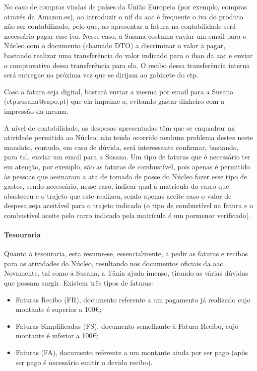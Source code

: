 No caso de compras vindas de países da União Europeia (por exemplo, compras através da Amazon.es), ao introduzir o \acrshort{nif} da \acrshort{aac} é frequente o \acrshort{iva} do produto não ser contabilizado, pelo que, ao apresentar a fatura na contabilidade será necessário pagar esse \acrshort{iva}. Nesse caso, a Susana costuma enviar um email para o Núcleo com o documento (chamado DTO) a discriminar o valor a pagar, bastando realizar uma transferência do valor indicado para o \acrshort{iban} da \acrshort{aac} e enviar o comprovativo dessa transferência para ela. O recibo dessa transferência interna será entregue na próxima vez que se dirijam ao gabinete do \acrshort{ctp}.

Caso a fatura seja digital, bastará enviar a mesma por email para a Susana (ctp.susana@sapo.pt) que ela imprime-a, evitando gastar dinheiro com a impressão da mesma.

A nível de contabilidade, as despesas apresentadas têm que se enquadrar na atividade permitida ao Núcleo, não tendo ocorrido nenhum problema destes neste mandato, contudo, em caso de dúvida, será interessante confirmar, bastando, para tal, enviar um email para a Susana. Um tipo de faturas que é necessário ter em atenção, por exemplo, são as faturas de combustível, pois apenas é permitido às pessoas que assinaram a ata de tomada de posse do Núcleo fazer esse tipo de gastos, sendo necessário, nesse caso, indicar qual a matrícula do carro que abasteceu e o trajeto que este realizou, sendo apenas aceite caso o valor de despesa seja aceitável para o trajeto indicado (o tipo de combustível na fatura e o combustível aceite pelo carro indicado pela matrícula é um pormenor verificado).

\paragraph{Tesouraria}

Quanto à tesouraria, esta resume-se, essencialmente, a pedir as faturas e recibos para as atividades do Núcleo, resultando nos documentos oficiais da \acrshort{aac}. Novamente, tal como a Susana, a Tânia ajuda imenso, tirando as várias dúvidas que possam surgir. Existem três tipos de faturas:
\begin{itemize}
    \item Faturas Recibo (FR), documento referente a um pagamento já realizado cujo montante é superior a 100€;
    \item Faturas Simplificadas (FS), documento semelhante à Fatura Recibo, cujo montante é inferior a 100€;
    \item Faturas (FA), documento referente a um montante ainda por ser pago (após ser pago é necessário emitir o devido recibo).
\end{itemize}

